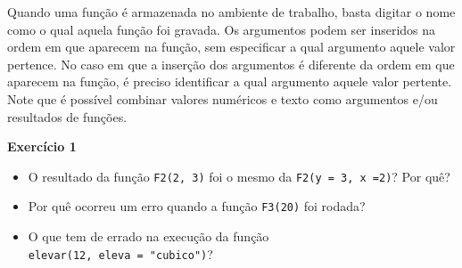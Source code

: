 \documentclass[]{book}
\newenvironment{Shaded}{\begin{snugshade}}{\end{snugshade}}
\newcommand{\ControlFlowTok}[1]{\textcolor[rgb]{0.13,0.29,0.53}{\textbf{#1}}}
\newcommand{\DataTypeTok}[1]{\textcolor[rgb]{0.13,0.29,0.53}{#1}}
\newcommand{\DecValTok}[1]{\textcolor[rgb]{0.00,0.00,0.81}{#1}}
\newcommand{\KeywordTok}[1]{\textcolor[rgb]{0.13,0.29,0.53}{\textbf{#1}}}
\newcommand{\NormalTok}[1]{#1}
\newcommand{\OperatorTok}[1]{\textcolor[rgb]{0.81,0.36,0.00}{\textbf{#1}}}
\newcommand{\StringTok}[1]{\textcolor[rgb]{0.31,0.60,0.02}{#1}}
\providecommand{\tightlist}{%
  \setlength{\itemsep}{0pt}\setlength{\parskip}{0pt}}
\begin{document}
\begin{Shaded}
\end{Shaded}

Quando uma função é armazenada no ambiente de trabalho, basta digitar o nome como o qual aquela função foi gravada. Os argumentos podem ser inseridos na ordem em que aparecem na função, sem especificar a qual argumento aquele valor pertence. No caso em que a inserção dos argumentos é diferente da ordem em que aparecem na função, é preciso identificar a qual argumento aquele valor pertente. Note que é possível combinar valores numéricos e texto como argumentos e/ou resultados de funções.

\begin{FOO}
\textbf{Exercício 1}

\begin{itemize}
\tightlist
\item
  O resultado da função \texttt{F2(2,\ 3)} foi o mesmo da
  \texttt{F2(y\ =\ 3,\ x\ =2)}? Por quê?
\item
  Por quê ocorreu um erro quando a função \texttt{F3(20)} foi rodada?
\item
  O que tem de errado na execução da função
  \texttt{elevar(12,\ eleva\ =\ "cubico")}?
\end{itemize}
\end{FOO}
\end{document}
